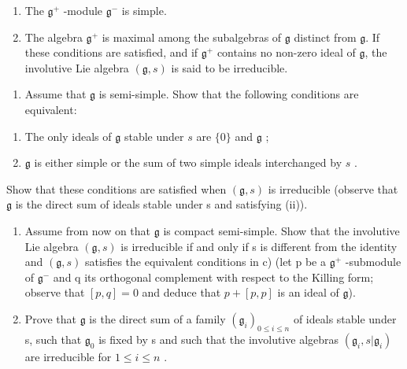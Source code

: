 \begin{enumerate}
\def\labelenumi{(\roman{enumi})}
\item
  The \(\mathfrak{g}^{+}\) -module \(\mathfrak{g}^{-}\) is simple.
\item
  The algebra \(\mathfrak{g}^{+}\) is maximal among the subalgebras of \(\mathfrak{g}\) distinct from \(\mathfrak{g}\). If these conditions are satisfied, and if \(\mathfrak{g}^{+}\) contains no non-zero ideal of \(\mathfrak{g}\), the involutive Lie algebra \((\mathfrak{g}, s)\) is said to be irreducible.
\end{enumerate}

\begin{enumerate}
\def\labelenumi{\alph{enumi})}
\setcounter{enumi}{2}
\tightlist
\item
  Assume that \(\mathfrak{g}\) is semi-simple. Show that the following conditions are equivalent:
\end{enumerate}

\begin{enumerate}
\def\labelenumi{(\roman{enumi})}
\item
  The only ideals of \(\mathfrak{g}\) stable under \(s\) are \(\{0\}\) and \(\mathfrak{g}\) ;
\item
  \(\mathfrak{g}\) is either simple or the sum of two simple ideals interchanged by \(s\) .
\end{enumerate}

Show that these conditions are satisfied when \((\mathfrak{g}, s)\) is irreducible (observe that \(\mathfrak{g}\) is the direct sum of ideals stable under s and satisfying (ii)).

\begin{enumerate}
\def\labelenumi{\alph{enumi})}
\setcounter{enumi}{3}
\item
  Assume from now on that \(\mathfrak{g}\) is compact semi-simple. Show that the involutive Lie algebra \((\mathfrak{g}, s)\) is irreducible if and only if s is different from the identity and \((\mathfrak{g}, s)\) satisfies the equivalent conditions in c) (let p be a \(\mathfrak{g}^{+}\) -submodule of \(\mathfrak{g}^{-}\) and q its orthogonal complement with respect to the Killing form; observe that \([p, q] = 0\) and deduce that \(p + [p, p]\) is an ideal of \(\mathfrak{g}\)).
\item
  Prove that \(\mathfrak{g}\) is the direct sum of a family \((\mathfrak{g}_{i})_{0\leq i\leq n}\) of ideals stable under s, such that \(\mathfrak{g}_{0}\) is fixed by s and such that the involutive algebras \((\mathfrak{g}_{i},s|\mathfrak{g}_{i})\) are irreducible for \(1\leq i\leq n\) .
\end{enumerate}

